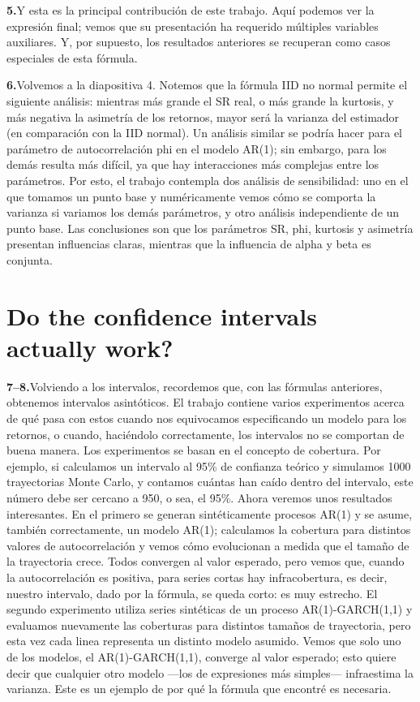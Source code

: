 \documentclass[11pt,a4paper]{article}
\newcommand{\seccionrule}{\vspace{-0.6em}{\color{accentblue}\hrule height 0.8pt}\vspace{0.8em}}
\newcommand{\diapo}[2]{%
  \par\medskip\noindent%
  \textbf{\textcolor{accentblue}{#1.}}\enspace #2\par\smallskip}
\begin{document}
\diapo{5}{Y esta es la principal contribución de este trabajo.
Aquí podemos ver la expresión final; vemos que su presentación ha
requerido múltiples variables auxiliares. Y, por supuesto, los resultados
anteriores se recuperan como casos especiales de esta fórmula.}

\diapo{6}{Volvemos a la diapositiva 4. Notemos que la fórmula IID no
normal permite el siguiente análisis: mientras más grande el SR real, o
más grande la kurtosis, y más negativa la asimetría de los retornos,
mayor será la varianza del estimador (en comparación con la IID normal). Un análisis similar se podría hacer
para el parámetro de autocorrelación phi en el modelo AR(1); sin embargo,
para los demás resulta más difícil, ya que hay interacciones más
complejas entre los parámetros.
Por esto, el trabajo contempla dos análisis de sensibilidad: uno en el
que tomamos un punto base y numéricamente vemos cómo se comporta la
varianza si variamos los demás parámetros, y otro análisis independiente
de un punto base.
Las conclusiones son que los parámetros SR, phi, kurtosis y asimetría
presentan influencias claras, mientras que la influencia de alpha y beta
es conjunta.}

\vspace{0.4em}
\seccionrule

\section*{Do the confidence intervals actually work?}

\diapo{7--8}{Volviendo a los intervalos, recordemos que, con las
fórmulas anteriores, obtenemos intervalos asintóticos. El trabajo
contiene varios experimentos acerca de qué pasa con estos cuando nos
equivocamos especificando un modelo para los retornos, o cuando,
haciéndolo correctamente, los intervalos no se comportan de buena
manera.
Los experimentos se basan en el concepto de cobertura. Por ejemplo, si
calculamos un intervalo al 95\% de confianza teórico y simulamos 1000
trayectorias Monte Carlo, y contamos cuántas han caído dentro del
intervalo, este número debe ser cercano a 950, o sea, el 95\%.
Ahora veremos unos resultados interesantes. En el primero se generan
sintéticamente procesos AR(1) y se asume, también correctamente, un
modelo AR(1); calculamos la cobertura para distintos valores de
autocorrelación y vemos cómo evolucionan a medida que el tamaño de la
trayectoria crece. Todos convergen al valor esperado, pero vemos que,
cuando la autocorrelación es positiva, para series cortas hay
infracobertura, es decir, nuestro intervalo, dado por la fórmula, se
queda corto: es muy estrecho.
El segundo experimento utiliza series sintéticas de un proceso
AR(1)-GARCH(1,1) y evaluamos nuevamente las coberturas para distintos
tamaños de trayectoria, pero esta vez cada linea representa un distinto modelo asumido. Vemos
que solo uno de los modelos, el AR(1)-GARCH(1,1), converge al valor
esperado; esto quiere decir que cualquier otro modelo —los de expresiones
más simples— infraestima la varianza. Este es un ejemplo de por qué la
fórmula que encontré es necesaria.}
\end{document}
